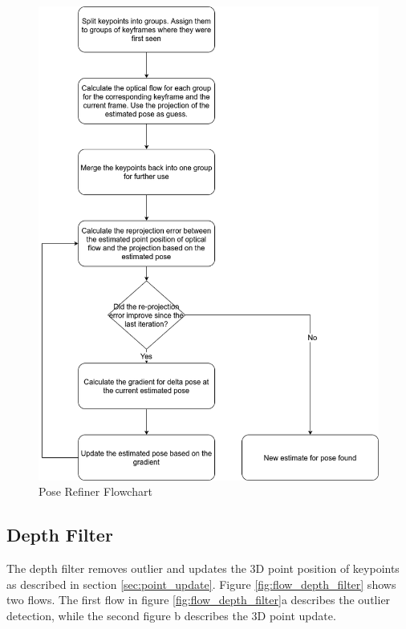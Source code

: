 \documentclass[11pt,a4paper,titlepage,oneside]{report}
\begin{document}
\begin{figure}[H]
  \centering
  \includegraphics[scale=0.3]{img/flow_pose_refiner.png}
  \caption{Pose Refiner Flowchart}\label{fig:flow_pose_refiner}
\end{figure}

\newpage\subsection{Depth Filter}\label{sec:depth_filter}

The depth filter removes outlier and updates the 3D point position of keypoints as described in section \ref{sec:point_update}. Figure \ref{fig:flow_depth_filter} shows two flows. The first flow in figure \ref{fig:flow_depth_filter}a describes the outlier detection, while the second figure b describes the 3D point update.
\end{document}
